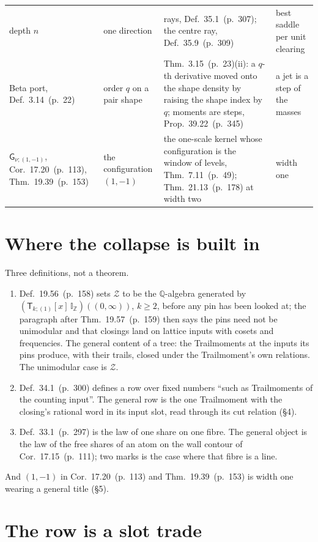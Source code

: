 \documentclass[11pt]{article}
\newcommand{\sG}{\mathsf G}
\newcommand{\sT}{\mathsf T}
\newcommand{\IZ}{\mathbb I_{\mathbb Z}}
\newcommand{\Tx}[3]{(\sT_{#1;(1)}[x]\,#2)((#3,\infty))}
\newcommand{\hb}[2]{#1~(p.~#2)}   %
\theoremstyle{plain}
\theoremstyle{remark}
\begin{document}
\begin{center}
\begin{tabular}{p{3.5cm}p{3.3cm}p{4.6cm}p{3.3cm}}
depth $n$ & one direction & rays, Def.~\hb{35.1}{307}; the centre ray, Def.~\hb{35.9}{309} & best saddle per unit clearing\\
Beta port, Def.~\hb{3.14}{22} & order $q$ on a pair shape & Thm.~\hb{3.15}{23}(ii): a $q$-th derivative moved onto the shape density by raising the shape index by $q$; moments are steps, Prop.~\hb{39.22}{345} & a jet is a step of the masses\\
$\sG_{\nu;(1,-1)}$, Cor.~\hb{17.20}{113}, Thm.~\hb{19.39}{153} & the configuration $(1,-1)$ & the one-scale kernel whose configuration is the window of levels, Thm.~\hb{7.11}{49}; Thm.~\hb{21.13}{178} at width two & width one\\
\bottomrule
\end{tabular}
\end{center}

\section{Where the collapse is built in}

Three definitions, not a theorem.

\begin{enumerate}[label=(\alph*)]
\item Def.~\hb{19.56}{158} sets $\mathcal Z$ to be the $\mathbb Q$-algebra generated by $\Tx{k}{\IZ}{0}$, $k\ge2$, before any pin has been looked at; the paragraph after Thm.~\hb{19.57}{159} then says the pins need not be unimodular and that closings land on lattice inputs with cosets and frequencies. The general content of a tree: the Trailmoments at the inputs its pins produce, with their trails, closed under the Trailmoment's own relations. The unimodular case is $\mathcal Z$.
\item Def.~\hb{34.1}{300} defines a row over fixed numbers ``such as Trailmoments of the counting input''. The general row is the one Trailmoment with the closing's rational word in its input slot, read through its cut relation (\S4).
\item Def.~\hb{33.1}{297} is the law of one share on one fibre. The general object is the law of the free shares of an atom on the wall contour of Cor.~\hb{17.15}{111}; two marks is the case where that fibre is a line.
\end{enumerate}
And $(1,-1)$ in Cor.~\hb{17.20}{113} and Thm.~\hb{19.39}{153} is width one wearing a general title (\S5).

\section{The row is a slot trade}
\end{document}
